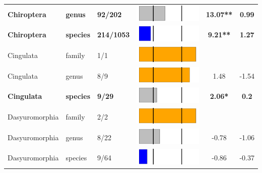 \begin{longtable}{lL{1.8cm}C{2cm}lcc}
  \textbf{Chiroptera} & \textbf{genus} & \textbf{92/202} & \includegraphics[width=0.20\linewidth, height=0.05\linewidth]{Table_figures/bar11.pdf} & \textbf{13.07**} & \textbf{0.99} \\ 
  \textbf{Chiroptera} & \textbf{species} & \textbf{214/1053} & \includegraphics[width=0.20\linewidth, height=0.05\linewidth]{Table_figures/bar12.pdf} & \textbf{9.21**} & \textbf{1.27} \\ 
  Cingulata & family & 1/1 & \includegraphics[width=0.20\linewidth, height=0.05\linewidth]{Table_figures/bar13.pdf} &   &   \\ 
  Cingulata & genus & 8/9 & \includegraphics[width=0.20\linewidth, height=0.05\linewidth]{Table_figures/bar14.pdf} & 1.48 & -1.54 \\ 
  \textbf{Cingulata} & \textbf{species} & \textbf{9/29} & \includegraphics[width=0.20\linewidth, height=0.05\linewidth]{Table_figures/bar15.pdf} & \textbf{2.06*} & \textbf{0.2} \\ 
  Dasyuromorphia & family & 2/2 & \includegraphics[width=0.20\linewidth, height=0.05\linewidth]{Table_figures/bar16.pdf} &   &   \\ 
  Dasyuromorphia & genus & 8/22 & \includegraphics[width=0.20\linewidth, height=0.05\linewidth]{Table_figures/bar17.pdf} & -0.78 & -1.06 \\ 
  Dasyuromorphia & species & 9/64 & \includegraphics[width=0.20\linewidth, height=0.05\linewidth]{Table_figures/bar18.pdf} & -0.86 & -0.37 \\ 

\end{longtable}
